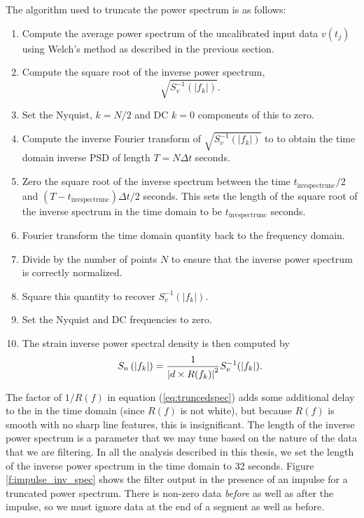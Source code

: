 The algorithm used to truncate the power spectrum is as follows:
\begin{enumerate}
\item Compute the average power spectrum of the uncalibrated input data
$v(t_j)$ using Welch's method as described in the previous section.
\item Compute the square root of the inverse power spectrum,
\begin{equation}
\sqrt{S^{-1}_v(|f_k|)}.
\end{equation}
\item Set the Nyquist, $k = N/2$ and DC $k = 0$ components of this to zero.
\item Compute the inverse Fourier transform of $\sqrt{S^{-1}_v(|f_k|)}$ to to
obtain the time domain inverse PSD of length $T = N\Delta t$ seconds.  \item
Zero the square root of the inverse spectrum between the time
$t_\mathrm{invspectrunc}/2$ and $(T-t_\mathrm{invspectrunc})\Delta t/2$
seconds. This sets the length of the square root of the inverse spectrum in
the time domain to be $t_\mathrm{invspectrunc}$ seconds.
\item Fourier transform the time domain quantity back to the frequency domain.
\item Divide by the number of points $N$ to ensure that the inverse power
spectrum is correctly normalized.
\item Square this quantity to recover $S^{-1}_v(|f_k|)$.
\item Set the Nyquist and DC frequencies to zero.
\item The strain inverse power spectral density is then computed by
\begin{equation}
S_n\left(\left|f_{k}\right|\right) = \frac{1}{\left|d \times R(f_k)\right|^2} S^{-1}_v(|f_k|).
\label{eq:truncedspec}
\end{equation}
\end{enumerate}
The factor of $1/R(f)$ in equation (\ref{eq:truncedspec}) adds some additional
delay to the \ospsd in the time domain (since $R(f)$ is not white), but
because $R(f)$ is smooth with no sharp line features, this is insignificant.
The length of the inverse power spectrum is a parameter that we may tune based
on the nature of the data that we are filtering. In all the analysis described
in this thesis, we set the length of the inverse power spectrum in the time
domain to 32 seconds.  Figure \ref{f:impulse_inv_spec} shows the filter output
in the presence of an impulse for a truncated power spectrum. There is
non-zero data \emph{before} as well as after the impulse, so we must ignore
data at the end of a segment as well as before.

